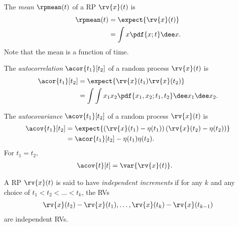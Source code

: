 \begin{mydefinition}
    The \emph{mean} $\rpmean(t)$ of a RP $\rv{x}(t)$ is 
    \begin{align}
        \rpmean(t) &= \expect{\rv{x}(t)}\\
        &= \int x\pdf{x; t}\dee x.
    \end{align}
    Note that the mean is a function of time.
\end{mydefinition}

\begin{mydefinition}[Autocorrelation]
    The \emph{autocorrelation} $\acor{t_{1}}[t_{2}]$ of a random process $\rv{x}(t)$ is
    \begin{align}
        \acor{t_{1}}[t_{2}] &= \expect{\rv{x}(t_{1})\rv{x}(t_{2})}\\
        &= \int\int x_{1}x_{2}\pdf{x_{1}, x_{2}; t_{1}, t_{2}}\dee x_{1} \dee x_{2}.
    \end{align}
\end{mydefinition}
\begin{mydefinition}[Autocovariance]
    The \emph{autocovariance} $\acov{t_{1}}[t_{2}]$ of a random process $\rv{x}(t)$ is
    \begin{align}
        \acov{t_{1}}[t_{2}] &= \expect{\left(\rv{x}(t_{1}) - \eta(t_{1})\right)\left(\rv{x}(t_{2}) - \eta(t_{2})\right)}\\
        &= \acor{t_{1}}[t_{2}] - \eta(t_{1})\eta(t_{2}).        
    \end{align}
    For $t_{1} = t_{2}$, 
    \begin{align}
        \acov{t}[t] &= \var{\rv{x}(t)}.
    \end{align}
\end{mydefinition}

\begin{mydefinition}
    A RP $\rv{x}(t)$ is said to have \emph{independent increments} if for any $k$ and any choice of $t_{1} < t_{2} < \ldots < t_{k}$, the RVs 
    \begin{align}
        \rv{x}(t_{2}) - \rv{x}(t_{1}), \ldots, \rv{x}(t_{k}) - \rv{x}(t_{k-1})
    \end{align}
    are independent RVs.
\end{mydefinition}


